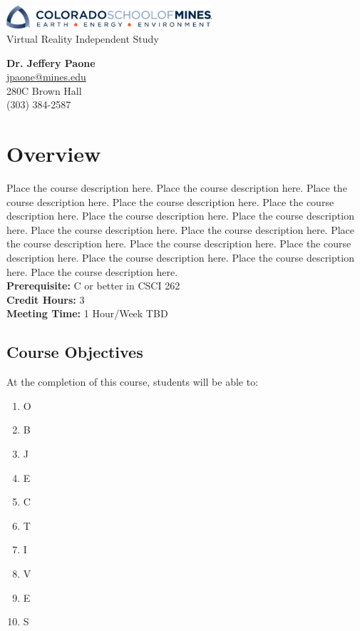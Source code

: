 \documentclass[11pt]{article}
\begin{document}
\begin{center}
    \includegraphics[width=3in]{logo-mines.png}
    \vspace{10mm}\\
    \LARGE Virtual Reality Independent Study
    \vspace{10mm}
\end{center}

\textbf{Dr. Jeffery Paone} \\
\url{jpaone@mines.edu} \\
280C Brown Hall \\
(303) 384-2587

\section{Overview}
Place the course description here. Place the course description here. Place the
course description here. Place the course description here. Place the course
description here. Place the course description here. Place the course
description here. Place the course description here. Place the course
description here. Place the course description here. Place the course
description here. Place the course description here. Place the course
description here. Place the course description here. Place the course
description here. \\

\textbf{Prerequisite:} C or better in CSCI 262 \\
\textbf{Credit Hours:} 3 \\
\textbf{Meeting Time:} 1 Hour/Week TBD

\subsection{Course Objectives}
At the completion of this course, students will be able to:
\begin{enumerate} \itemsep-0.4em
    \item O
    \item B
    \item J
    \item E
    \item C
    \item T
    \item I
    \item V
    \item E
    \item S
\end{enumerate}
\end{document}

